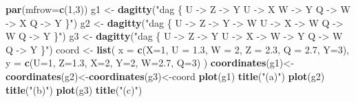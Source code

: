 \documentclass[
]{book}
\newenvironment{Shaded}{\begin{snugshade}}{\end{snugshade}}
\newcommand{\AttributeTok}[1]{\textcolor[rgb]{0.13,0.29,0.53}{#1}}
\newcommand{\DecValTok}[1]{\textcolor[rgb]{0.00,0.00,0.81}{#1}}
\newcommand{\FloatTok}[1]{\textcolor[rgb]{0.00,0.00,0.81}{#1}}
\newcommand{\FunctionTok}[1]{\textcolor[rgb]{0.13,0.29,0.53}{\textbf{#1}}}
\newcommand{\NormalTok}[1]{#1}
\newcommand{\OtherTok}[1]{\textcolor[rgb]{0.56,0.35,0.01}{#1}}
\newcommand{\StringTok}[1]{\textcolor[rgb]{0.31,0.60,0.02}{#1}}
\begin{document}
\begin{Shaded}
\begin{Highlighting}[]
\FunctionTok{par}\NormalTok{(}\AttributeTok{mfrow=}\FunctionTok{c}\NormalTok{(}\DecValTok{1}\NormalTok{,}\DecValTok{3}\NormalTok{))}
\NormalTok{g1 }\OtherTok{\textless{}{-}} \FunctionTok{dagitty}\NormalTok{(}\StringTok{"dag \{}
\StringTok{    U {-}\textgreater{} Z {-}\textgreater{} Y }
\StringTok{    U {-}\textgreater{} X}
\StringTok{    W {-}\textgreater{} Y}
\StringTok{    Q {-}\textgreater{} W {-}\textgreater{} X}
\StringTok{    Q {-}\textgreater{} Y}
\StringTok{    \}"}\NormalTok{)}
\NormalTok{g2 }\OtherTok{\textless{}{-}} \FunctionTok{dagitty}\NormalTok{(}\StringTok{"dag \{}
\StringTok{    U {-}\textgreater{} Z {-}\textgreater{} Y {-}\textgreater{} W }
\StringTok{    U {-}\textgreater{} X {-}\textgreater{} W }
\StringTok{    Q {-}\textgreater{} W}
\StringTok{    Q {-}\textgreater{} Y}
\StringTok{    \}"}\NormalTok{)}
\NormalTok{g3 }\OtherTok{\textless{}{-}} \FunctionTok{dagitty}\NormalTok{(}\StringTok{"dag \{}
\StringTok{    U {-}\textgreater{} Z {-}\textgreater{} Y }
\StringTok{    U {-}\textgreater{} X {-}\textgreater{} W  {-}\textgreater{} Y}
\StringTok{    Q {-}\textgreater{} W}
\StringTok{    Q {-}\textgreater{} Y}
\StringTok{    \}"}\NormalTok{)}
\NormalTok{coord }\OtherTok{\textless{}{-}} 
  \FunctionTok{list}\NormalTok{( }\AttributeTok{x =} \FunctionTok{c}\NormalTok{(}\AttributeTok{X=}\DecValTok{1}\NormalTok{, }\AttributeTok{U =} \FloatTok{1.3}\NormalTok{, }\AttributeTok{W =} \DecValTok{2}\NormalTok{, }\AttributeTok{Z =} \FloatTok{2.3}\NormalTok{, }\AttributeTok{Q =} \FloatTok{2.7}\NormalTok{, }\AttributeTok{Y=}\DecValTok{3}\NormalTok{), }
        \AttributeTok{y =} \FunctionTok{c}\NormalTok{(}\AttributeTok{U=}\DecValTok{1}\NormalTok{,   }\AttributeTok{Z=}\FloatTok{1.3}\NormalTok{, }\AttributeTok{X=}\DecValTok{2}\NormalTok{, }\AttributeTok{Y=}\DecValTok{2}\NormalTok{,   }\AttributeTok{W=}\FloatTok{2.7}\NormalTok{,  }\AttributeTok{Q=}\DecValTok{3}\NormalTok{)}
\NormalTok{  )}
\FunctionTok{coordinates}\NormalTok{(g1)}\OtherTok{\textless{}{-}}\FunctionTok{coordinates}\NormalTok{(g2)}\OtherTok{\textless{}{-}}\FunctionTok{coordinates}\NormalTok{(g3)}\OtherTok{\textless{}{-}}\NormalTok{coord}
\FunctionTok{plot}\NormalTok{(g1)}
\FunctionTok{title}\NormalTok{(}\StringTok{"(a)"}\NormalTok{)}
\FunctionTok{plot}\NormalTok{(g2)}
\FunctionTok{title}\NormalTok{(}\StringTok{"(b)"}\NormalTok{)}
\FunctionTok{plot}\NormalTok{(g3)}
\FunctionTok{title}\NormalTok{(}\StringTok{"(c)"}\NormalTok{)}
\end{Highlighting}
\end{Shaded}
\end{document}
